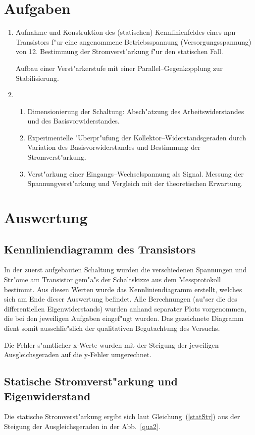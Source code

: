 \documentclass[a4paper,10pt]{article}
\begin{document}
\section{Aufgaben}
\begin{enumerate}
\item Aufnahme und Konstruktion des (statischen) Kennlinienfeldes eines npn--Transistors f"ur eine angenommene Betriebsspannung (Versorgungsspannung) von \unit{12}{\volt}. Bestimmung der Stromverst"arkung f"ur den statischen Fall.

Aufbau einer Verst"arkerstufe mit einer Parallel--Gegenkopplung zur Stabilisierung.
\item 
\begin{enumerate}
\item Dimensionierung der Schaltung: Absch"atzung des Arbeitswiderstandes und des Basisvorwiderstandes.
\item Experimentelle "Uberpr"ufung der Kollektor--Widerstandsgeraden durch Variation des Basisvorwiderstandes und Bestimmung der Stromverst"arkung.
\item Verst"arkung einer Eingangs--Wechselspannung als Signal. Messung der Spannungverst"arkung und Vergleich mit der theoretischen Erwartung.
\end{enumerate}
\end{enumerate}

\newpage
\section{Auswertung}

\subsection{Kennliniendiagramm des Transistors}
In der zuerst aufgebauten Schaltung wurden die verschiedenen Spannungen und Str"ome am Transistor gem"a"s der Schaltskizze aus dem Messprotokoll bestimmt. Aus diesen Werten wurde das Kennliniendiagramm erstellt, welches sich am Ende dieser Auswertung befindet. Alle Berechnungen (au"ser die des differentiellen Eigenwiderstands) wurden anhand separater Plots vorgenommen, die bei den jeweiligen Aufgaben eingef"ugt wurden. Das gezeichnete Diagramm dient somit ausschlie"slich der qualitativen Begutachtung des Versuchs.

Die Fehler s"amtlicher x-Werte wurden mit der Steigung der jeweiligen Ausgleichsgeraden auf die y-Fehler umgerechnet.


\subsection{Statische Stromverst"arkung und Eigenwiderstand}
Die statische Stromverst"arkung ergibt sich laut Gleichung~(\ref{statStr}) aus der Steigung der Ausgleichsgeraden in der Abb.~\ref{qua2}.
\end{document}
